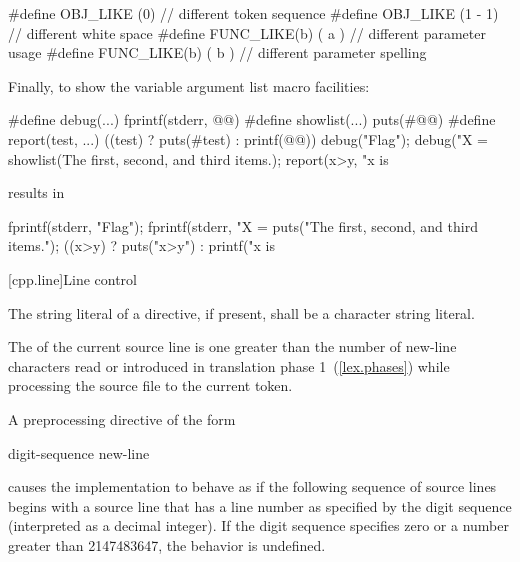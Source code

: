 \begin{codeblock}
#define OBJ_LIKE    (0)      // different token sequence
#define OBJ_LIKE    (1 - 1)  // different white space
#define FUNC_LIKE(b) ( a )   // different parameter usage
#define FUNC_LIKE(b) ( b )   // different parameter spelling
\end{codeblock}
\exitexample

\pnum
\enterexample
Finally, to show the variable argument list macro facilities:

\begin{codeblock}
#define debug(...) fprintf(stderr, @@)
#define showlist(...) puts(#@@)
#define report(test, ...) ((test) ? puts(#test) : printf(@@))
debug("Flag");
debug("X = %
showlist(The first, second, and third items.);
report(x>y, "x is %
\end{codeblock}

results in

\begin{codeblock}
fprintf(stderr, "Flag");
fprintf(stderr, "X = %
puts("The first, second, and third items.");
((x>y) ? puts("x>y") : printf("x is %
  
\end{codeblock}
\exitexample
{}

[cpp.line]{Line control}%
%

\pnum
The string literal of a
directive, if present,
shall be a character string literal.

\pnum
The
of the current source line is one greater than
the number of new-line characters read or introduced
in translation phase 1~(\ref{lex.phases})
while processing the source file to the current token.

\pnum
A preprocessing directive of the form

\begin{ncsimplebnf}
 digit-sequence new-line
\end{ncsimplebnf}

causes the implementation to behave as if
the following sequence of source lines begins with a
source line that has a line number as specified
by the digit sequence (interpreted as a decimal integer).
If the digit sequence specifies zero
or a number greater than 2147483647,
the behavior is undefined.

